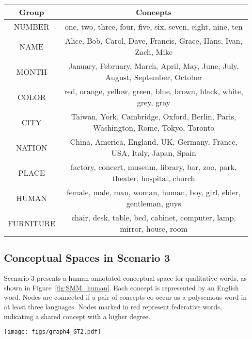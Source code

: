 \begin{table*}[h!]
    \centering
    \begin{tabular}{cc}
        \toprule
        \textbf{Group} & \textbf{Concepts} \\
        \midrule
        NUMBER & one, two, three, four, five, six, seven, eight, nine, ten \\
        NAME & Alice, Bob, Carol, Dave, Francis, Grace, Hans, Ivan, Zach, Mike \\
        MONTH & January, February, March, April, May, June, July, August, September, October \\
        COLOR & red, orange, yellow, green, blue, brown, black, white, grey, gray \\
        CITY & Taiwan, York, Cambridge, Oxford, Berlin, Paris, Washington, Rome, Tokyo, Toronto \\
        NATION & China, America, England, UK, Germany, France, USA, Italy, Japan, Spain \\
        PLACE & factory, concert, museum, library, bar, zoo, park, theater, hospital, church \\
        HUMAN & female, male, man, woman, human, boy, girl, elder, gentleman, guys \\
        FURNITURE & chair, desk, table, bed, cabinet, computer, lamp, mirror, house, room \\
        \bottomrule
    \end{tabular}
    \caption{Specific concepts from different semantic groups.}
    \label{tab:concepts_SC}
\end{table*}

\subsection{Conceptual Spaces in Scenario 3}
\label{app:CS}
Scenario 3 presents a human-annotated conceptual space for qualitative words, as shown in Figure~\ref{fig:SMM_human}. Each concept is represented by an English word. Nodes are connected if a pair of concepts co-occur as a polysemous word in at least three languages. Nodes marked in red represent federative words, indicating a shared concept with a higher degree.

\begin{figure*}
    \centering
    \texttt{[image: figs/graph4\_GT2.pdf]}
    \caption{A semantic map for the domain of qualitative words, with federative notions which have a higher degree highlighted in red.}
    \label{fig:SMM_human}
\end{figure*}

